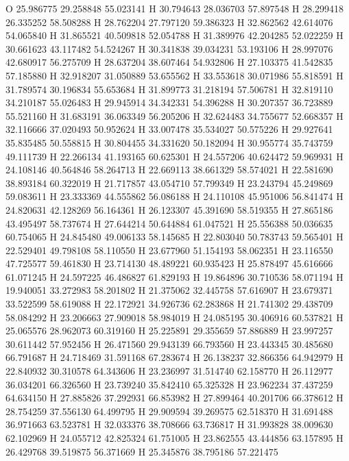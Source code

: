 \documentclass{article}
\begin{document}
O 25.986775 29.258848 55.023141 
H 30.794643 28.036703 57.897548 
H 28.299418 26.335252 58.508288 
H 28.762204 27.797120 59.386323 
H 32.862562 42.614076 54.065840 
H 31.865521 40.509818 52.054788 
H 31.389976 42.204285 52.022259 
H 30.661623 43.117482 54.524267 
H 30.341838 39.034231 53.193106 
H 28.997076 42.680917 56.275709 
H 28.637204 38.607464 54.932806 
H 27.103375 41.542835 57.185880 
H 32.918207 31.050889 53.655562 
H 33.553618 30.071986 55.818591 
H 31.789574 30.196834 55.653684 
H 31.899773 31.218194 57.506781 
H 32.819110 34.210187 55.026483 
H 29.945914 34.342331 54.396288 
H 30.207357 36.723889 55.521160 
H 31.683191 36.063349 56.205206 
H 32.624483 34.755677 52.668357 
H 32.116666 37.020493 50.952624 
H 33.007478 35.534027 50.575226 
H 29.927641 35.835485 50.558815 
H 30.804455 34.331620 50.182094 
H 30.955774 35.743759 49.111739 
H 22.266134 41.193165 60.625301 
H 24.557206 40.624472 59.969931 
H 24.108146 40.564846 58.264713 
H 22.669113 38.661329 58.574021 
H 22.581690 38.893184 60.322019 
H 21.717857 43.054710 57.799349 
H 23.243794 45.249869 59.083611 
H 23.333369 44.555862 56.086188 
H 24.110108 45.951006 56.841474 
H 24.820631 42.128269 56.164361 
H 26.123307 45.391690 58.519355 
H 27.865186 43.495497 58.737674 
H 27.644214 50.644884 61.047521 
H 25.556388 50.036635 60.754065 
H 24.845480 49.006133 58.145685 
H 22.803040 50.783743 59.565401 
H 22.529401 49.798108 58.110550 
H 23.677960 51.154193 58.062351 
H 23.116550 47.725577 59.461830 
H 23.714130 48.489221 60.935423 
H 25.878497 45.616666 61.071245 
H 24.597225 46.486827 61.829193 
H 19.864896 30.710536 58.071194 
H 19.940051 33.272983 58.201802 
H 21.375062 32.445758 57.616907 
H 23.679371 33.522599 58.619088 
H 22.172921 34.926736 62.283868 
H 21.741302 29.438709 58.084292 
H 23.206663 27.909018 58.984019 
H 24.085195 30.406916 60.537821 
H 25.065576 28.962073 60.319160 
H 25.225891 29.355659 57.886889 
H 23.997257 30.611442 57.952456 
H 26.471560 29.943139 66.793560 
H 23.443345 30.485680 66.791687 
H 24.718469 31.591168 67.283674 
H 26.138237 32.866356 64.942979 
H 22.840932 30.310578 64.343606 
H 23.236997 31.514740 62.158770 
H 26.112977 36.034201 66.326560 
H 23.739240 35.842410 65.325328 
H 23.962234 37.437259 64.634150 
H 27.885826 37.292931 66.853982 
H 27.899464 40.201706 66.378612 
H 28.754259 37.556130 64.499795 
H 29.909594 39.269575 62.518370 
H 31.691488 36.971663 63.523781 
H 32.033376 38.708666 63.736817 
H 31.993828 38.009630 62.102969 
H 24.055712 42.825324 61.751005 
H 23.862555 43.444856 63.157895 
H 26.429768 39.519875 56.371669 
H 25.345876 38.795186 57.221475 
\end{document}

